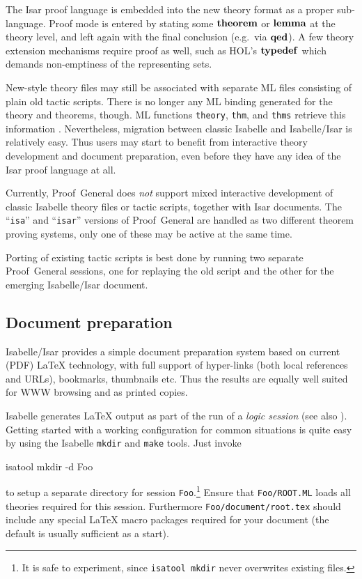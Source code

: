 The Isar proof language is embedded into the new theory format as a proper
sub-language.  Proof mode is entered by stating some ${\mathord{\mathbf{theorem}}}$ or
${\mathord{\mathbf{lemma}}}$ at the theory level, and left again with the final conclusion
(e.g.\ via ${\mathord{\mathbf{qed}}}$).  A few theory extension mechanisms require proof as
well, such as HOL's ${\mathord{\mathbf{typedef}}}$ which demands non-emptiness of the
representing sets.

New-style theory files may still be associated with separate ML files
consisting of plain old tactic scripts.  There is no longer any ML binding
generated for the theory and theorems, though.  ML functions \texttt{theory},
\texttt{thm}, and \texttt{thms} retrieve this information \cite{isabelle-ref}.
Nevertheless, migration between classic Isabelle and Isabelle/Isar is
relatively easy.  Thus users may start to benefit from interactive theory
development and document preparation, even before they have any idea of the
Isar proof language at all.

\begin{warn}
  Currently, Proof~General does \emph{not} support mixed interactive
  development of classic Isabelle theory files or tactic scripts, together
  with Isar documents.  The ``\texttt{isa}'' and ``\texttt{isar}'' versions of
  Proof~General are handled as two different theorem proving systems, only one
  of these may be active at the same time.
\end{warn}

Porting of existing tactic scripts is best done by running two separate
Proof~General sessions, one for replaying the old script and the other for the
emerging Isabelle/Isar document.


\subsection{Document preparation}\label{sec:document-prep}

Isabelle/Isar provides a simple document preparation system based on current
(PDF) {\LaTeX} technology, with full support of hyper-links (both local
references and URLs), bookmarks, thumbnails etc.  Thus the results are equally
well suited for WWW browsing and as printed copies.

\medskip

Isabelle generates {\LaTeX} output as part of the run of a \emph{logic
  session} (see also \cite{isabelle-sys}).  Getting started with a working
configuration for common situations is quite easy by using the Isabelle
\texttt{mkdir} and \texttt{make} tools.  Just invoke
\begin{ttbox}
  isatool mkdir -d Foo
\end{ttbox}
to setup a separate directory for session \texttt{Foo}.\footnote{It is safe to
  experiment, since \texttt{isatool mkdir} never overwrites existing files.}
Ensure that \texttt{Foo/ROOT.ML} loads all theories required for this session.
Furthermore \texttt{Foo/document/root.tex} should include any special {\LaTeX}
macro packages required for your document (the default is usually sufficient
as a start).

